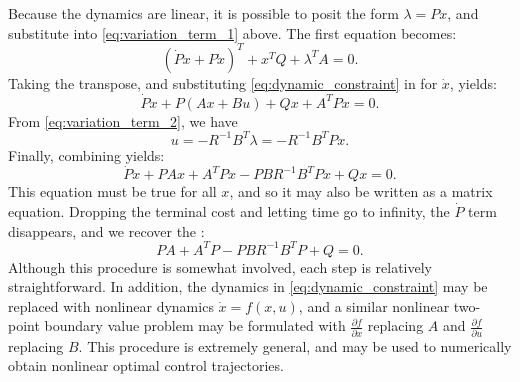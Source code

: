 \documentclass[a4 paper]{article}
\begin{document}
\bigbreak

Because the dynamics are linear, it is possible to posit the form \( \lambda = P x \), and substitute into \ref{eq:variation_term_1} above. 
The first equation becomes:
\begin{equation}
    \left( \dot{P} x + P \dot{x} \right)^T + x^T Q + \lambda^T A = 0.
\label{eq:posit_form}
\end{equation}
Taking the transpose, and substituting \ref{eq:dynamic_constraint} in for \( \dot{x} \), yields:
\begin{equation}
    \dot{P} x + P (A x + B u) + Q x + A^T P x = 0.
\label{eq:transpose_substitution}
\end{equation}
From \ref{eq:variation_term_2}, we have
\begin{equation}
    u = -R^{-1} B^T \lambda = -R^{-1} B^T P x.
\label{eq:control_input}
\end{equation}
Finally, combining yields:
\begin{equation}
    \dot{P} x + P A x + A^T P x - P B R^{-1} B^T P x + Q x = 0.
\label{eq:combining_yields}
\end{equation}
This equation must be true for all \( x \), and so it may also be written as a matrix equation.
 Dropping the terminal cost and letting time go to infinity, the \( \dot{P} \) term disappears, and we recover the
:
\begin{equation}
    P A + A^T P - P B R^{-1} B^T P + Q = 0.
\label{eq:riccati_equation}
\end{equation}
Although this procedure is somewhat involved, each step is relatively straightforward. In addition, the dynamics in \ref{eq:dynamic_constraint} 
may be replaced with nonlinear dynamics \( \dot{x} = f(x,u) \), and a similar nonlinear two-point boundary value problem may be formulated 
with \( \frac{\partial f}{\partial x} \) replacing \( A \) and \( \frac{\partial f}{\partial u} \) replacing \( B \). 
This procedure is extremely general, and may be used to numerically obtain nonlinear optimal control trajectories.




\newpage
\end{document}
